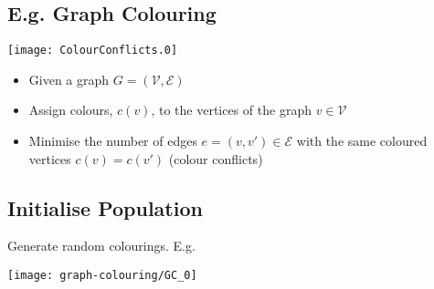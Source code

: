 \begin{slide}
\section[-2]{E.g. Graph Colouring}

\begin{PauseHighLight}
  \begin{center}
    \texttt{[image: ColourConflicts.0]}\pause
    \pauseb
  \end{center}
  \vspace*{-2cm}
  \begin{itemize}
  \item  Given a graph $G=(\mathcal{V},\mathcal{E})$\pause
  \item Assign colours, $c(v)$, to the vertices of the graph
    $v\in\mathcal{V}$\pause 
  \item Minimise the number of edges $e=(v,v')\in\mathcal{E}$ with the same
  coloured vertices $c(v)=c(v')$ (colour conflicts)\pause
  \end{itemize}
\end{PauseHighLight}

\end{slide}


\begin{slide}
\section[-1]{Initialise Population}

\pb
Generate random colourings\pause. E.g.
\color{TextColor}
\begin{center}
  \texttt{[image: graph-colouring/GC\_0]}\pause
  \pause
\end{center}
\end{slide}



